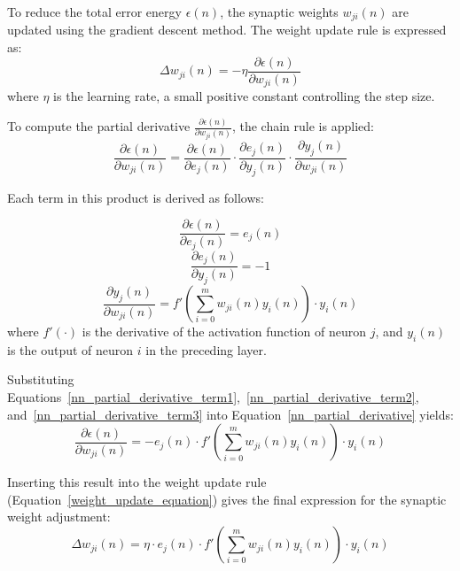 To reduce the total error energy $\epsilon(n)$, the synaptic weights $w_{ji}(n)$ are updated using the gradient descent method. The weight update rule is expressed as:
\begin{equation} \label{weight_update_equation}
    \Delta w_{ji}(n) = -\eta \frac{\partial \epsilon(n)}{\partial w_{ji}(n)}
\end{equation}
where $\eta$ is the learning rate, a small positive constant controlling the step size.

To compute the partial derivative $\frac{\partial \epsilon(n)}{\partial w_{ji}(n)}$, the chain rule is applied:
\begin{equation} \label{nn_partial_derivative}
    \frac{\partial \epsilon(n)}{\partial w_{ji}(n)} = 
    \frac{\partial \epsilon(n)}{\partial e_j(n)} \cdot 
    \frac{\partial e_j(n)}{\partial y_j(n)} \cdot 
    \frac{\partial y_j(n)}{\partial w_{ji}(n)}
\end{equation}

Each term in this product is derived as follows:

\begin{equation} \label{nn_partial_derivative_term1}
    \frac{\partial \epsilon(n)}{\partial e_j(n)} = e_j(n)
\end{equation}
\begin{equation} \label{nn_partial_derivative_term2}
    \frac{\partial e_j(n)}{\partial y_j(n)} = -1
\end{equation}
\begin{equation} \label{nn_partial_derivative_term3}
    \frac{\partial y_j(n)}{\partial w_{ji}(n)} = 
    f'\left(\sum_{i=0}^{m} w_{ji}(n) y_i(n)\right) \cdot y_i(n)
\end{equation}
where $f'(\cdot)$ is the derivative of the activation function of neuron $j$, and $y_i(n)$ is the output of neuron $i$ in the preceding layer.

Substituting Equations~\ref{nn_partial_derivative_term1},~\ref{nn_partial_derivative_term2}, and~\ref{nn_partial_derivative_term3} into Equation~\ref{nn_partial_derivative} yields:
\begin{equation}
    \frac{\partial \epsilon(n)}{\partial w_{ji}(n)} = 
    -e_j(n) \cdot f'\left(\sum_{i=0}^{m} w_{ji}(n) y_i(n)\right) \cdot y_i(n)
\end{equation}

Inserting this result into the weight update rule (Equation~\ref{weight_update_equation}) gives the final expression for the synaptic weight adjustment:
\begin{equation}
    \Delta w_{ji}(n) = \eta \cdot e_j(n) \cdot f'\left(\sum_{i=0}^{m} w_{ji}(n) y_i(n)\right) \cdot y_i(n)
\end{equation}


